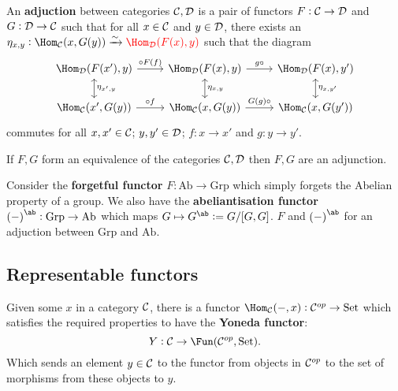 \documentclass[../Year2.tex]{subfiles}
\begin{document}
\begin{definition}[Adjunction]
    An \textbf{adjuction} between categories $\mathcal{C},\mathcal{D}$ is a pair of functors $F:\mathcal{C}\rightarrow\mathcal{D}$ and $G:\mathcal{D}\rightarrow\mathcal{C}$ such that for all $x\in\mathcal{C}$ and $y\in\mathcal{D}$, there exists an $\eta_{x,y}:\Hom_\CCC(x,G(y))\xrightarrow{\sim}\textcolor{red}{\Hom_\DDD(F(x),y)}$ such that the diagram 
    \vspace{-10pt}
    \[
        \begin{tikzcd}
            \Hom_\DDD(F(x'),y) \arrow[d, leftrightarrow, "\eta_{x',y}"] \arrow[r, "\circ F(f)"] & 
            \Hom_\DDD(F(x),y) \arrow[d, leftrightarrow, "\eta_{x,y}"] \arrow[r, "g\circ"] & 
            \Hom_\DDD(F(x),y') \arrow[d, leftrightarrow, "\eta_{x,y'}"] \\
            \Hom_\CCC(x',G(y)) \arrow[r, "\circ f"] & 
            \Hom_\CCC(x,G(y)) \arrow[r, "G(g)\circ"] & 
            \Hom_\CCC(x,G(y'))
        \end{tikzcd}
    \] commutes for all $x,x'\in\mathcal{C}$; $y,y'\in\mathcal{D}$; $f:x\rightarrow x'$ and $g:y\rightarrow y'$.
\end{definition}

\begin{theorem}
    If $F,G$ form an equivalence of the categories $\mathcal{C},\mathcal{D}$ then $F,G$ are an adjunction.
\end{theorem}

\begin{examples}
    Consider the \textbf{forgetful functor} $F:\text{Ab}\rightarrow\text{Grp}$ which simply forgets the Abelian property of a group. We also have the \textbf{abeliantisation functor} ${(-)}^{\ab}:\text{Grp}\rightarrow\text{Ab}$ which maps $G\mapsto G^{\ab}:=G/[G,G]$. $F$ and ${(-)}^{\ab}$ for an adjuction between $\text{Grp}$ and $\text{Ab}$.
\end{examples}

\subsection{Representable functors}

\begin{definition}
    Given some $x$ in a category $\mathcal{C}$, there is a functor $\Hom_\CCC(-,x):\CCC^{op}\rightarrow\text{Set}$ which satisfies the required properties to have the \textbf{Yoneda functor}: \[
        Y:\CCC\rightarrow\Fun(\CCC^{op},\text{Set})
        \black{.}
    \] Which sends an element $y\in\mathcal{C}$ to the functor from objects in $\mathcal{C}^{op}$ to the set of morphisms from these objects to $y$. 
\end{definition}
\end{document}
